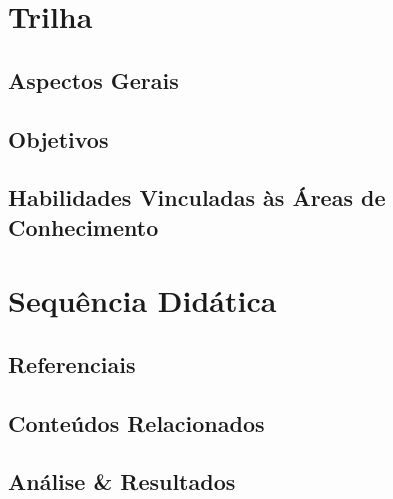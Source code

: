 \documentclass[aspectratio=169]{beamer}
\begin{document}
\usetikzlibrary{positioning}
\usetikzlibrary{shadows.blur, trees}



\newcommand{\autor}{Rodrigo Ribamar Silva do Nascimento}
\newcommand{\github}{github.com/physikices}
\newcommand{\email}{rodrigo.nascimento@edu.udesc.br}
\newcommand{\website}{}
\capa



\section{Trilha}
\subsection{Aspectos Gerais}
\subsection{Objetivos}
\subsection{Habilidades Vinculadas às Áreas de Conhecimento}

\section{Sequência Didática}
\subsection{Referenciais}
\subsection{Conteúdos Relacionados}
\subsection{Análise \& Resultados}
\end{document}

